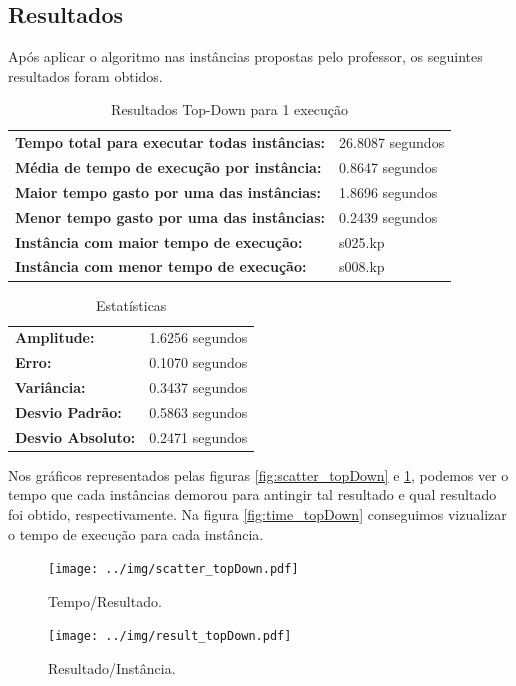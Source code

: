\documentclass[a4paper, 12pt]{article}
\begin{document}
\subsection{Resultados}

Após aplicar o algoritmo  nas instâncias propostas pelo professor, os seguintes resultados
foram obtidos.
\begin{table}[!htb]
    \begin{tabular}{ll}
    \textbf{Tempo total para executar todas instâncias:} & 26.8087 segundos \\
    \textbf{Média de tempo de execução por instância:} & 0.8647 segundos \\
    \textbf{Maior tempo gasto por uma das instâncias:} & 1.8696 segundos \\
    \textbf{Menor tempo gasto por uma das instâncias:} & 0.2439 segundos \\
    \textbf{Instância com maior tempo de execução:} & s025.kp \\
    \textbf{Instância com menor tempo de execução:} & s008.kp
    \end{tabular}
    \caption{Resultados Top-Down para 1 execução}
    \label{tab:topdown_exec}
\end{table}
\begin{table}[!htb]
    \begin{tabular}{ll}
    \textbf{Amplitude:} & 1.6256 segundos \\
    \textbf{Erro:} & 0.1070 segundos \\
    \textbf{Variância:} & 0.3437 segundos \\
    \textbf{Desvio Padrão:} & 0.5863 segundos \\
    \textbf{Desvio Absoluto:} & 0.2471 segundos
    \end{tabular}
    \caption{Estatísticas}
    \label{tab:estatistica_topdown}
\end{table}

\newpage
Nos gráficos representados pelas figuras \ref{fig:scatter_topDown} e \ref{fig:result_topDown}, podemos ver o tempo
que cada instâncias demorou para antingir tal resultado e qual resultado foi obtido, respectivamente. 
Na figura \ref{fig:time_topDown} conseguimos vizualizar o tempo de execução para cada instância.
\begin{figure}[!htb]
    \centering
    \begin{minipage}{0.55\textwidth}
        \centering
        \texttt{[image: ../img/scatter\_topDown.pdf]}
        \caption{Tempo/Resultado.}
        \label{fig:scatter_topDown}
    \end{minipage}%
    \begin{minipage}{0.55\textwidth}
        \centering
        \texttt{[image: ../img/result\_topDown.pdf]}
        \caption{Resultado/Instância.}
        \label{fig:result_topDown}
    \end{minipage}
\end{figure}
\end{document}
